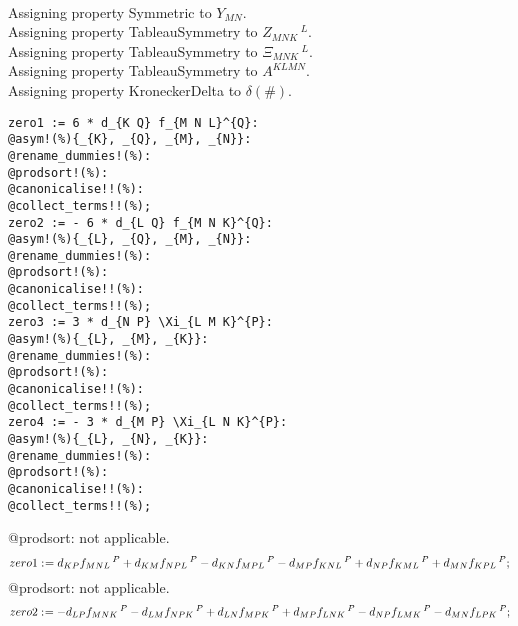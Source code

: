 \documentclass[11pt]{article}
\def\specialcolon{\mathrel{\mathop{:}}\hspace{-.5em}}
\begin{document}
\\
Assigning property Symmetric to ${Y}_{M N}$.
\\
Assigning property TableauSymmetry to ${Z}_{M N K}\,^{L}$.
\\
Assigning property TableauSymmetry to ${\Xi}_{M N K}\,^{L}$.
\\
Assigning property TableauSymmetry to ${A}^{K L M N}$.
\\
Assigning property KroneckerDelta to $\delta(\#)$.
\\
{\color[named]{Blue}\begin{verbatim}
zero1 := 6 * d_{K Q} f_{M N L}^{Q}:
@asym!(%){_{K}, _{Q}, _{M}, _{N}}:
@rename_dummies!(%):
@prodsort!(%):
@canonicalise!!(%):
@collect_terms!!(%);
zero2 := - 6 * d_{L Q} f_{M N K}^{Q}:
@asym!(%){_{L}, _{Q}, _{M}, _{N}}:
@rename_dummies!(%):
@prodsort!(%):
@canonicalise!!(%):
@collect_terms!!(%);
zero3 := 3 * d_{N P} \Xi_{L M K}^{P}:
@asym!(%){_{L}, _{M}, _{K}}:
@rename_dummies!(%):
@prodsort!(%):
@canonicalise!!(%):
@collect_terms!!(%);
zero4 := - 3 * d_{M P} \Xi_{L N K}^{P}:
@asym!(%){_{L}, _{N}, _{K}}:
@rename_dummies!(%):
@prodsort!(%):
@canonicalise!!(%):
@collect_terms!!(%);
\end{verbatim}}
@prodsort: not applicable.
\begin{dmath*}[compact, spread=2pt]
zero1\specialcolon{}= {d}_{K P} {f}_{M N L}\,^{P} + {d}_{K M} {f}_{N P L}\,^{P} - {d}_{K N} {f}_{M P L}\,^{P} - {d}_{M P} {f}_{K N L}\,^{P} + {d}_{N P} {f}_{K M L}\,^{P} + {d}_{M N} {f}_{K P L}\,^{P};
\end{dmath*}
@prodsort: not applicable.
\begin{dmath*}[compact, spread=2pt]
zero2\specialcolon{}=  - {d}_{L P} {f}_{M N K}\,^{P} - {d}_{L M} {f}_{N P K}\,^{P} + {d}_{L N} {f}_{M P K}\,^{P} + {d}_{M P} {f}_{L N K}\,^{P} - {d}_{N P} {f}_{L M K}\,^{P} - {d}_{M N} {f}_{L P K}\,^{P};
\end{dmath*}
\end{document}
